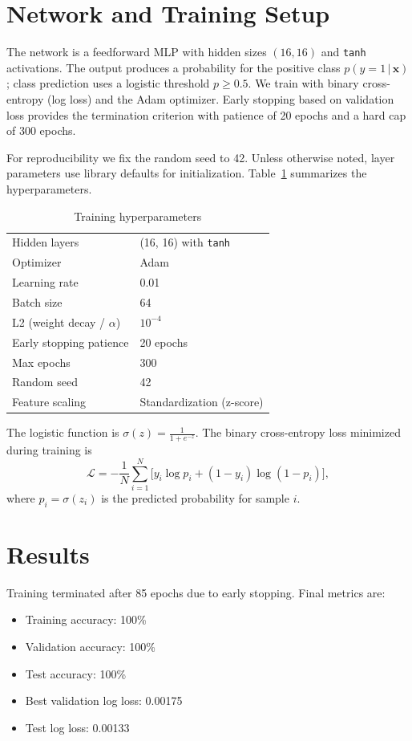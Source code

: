 \documentclass[journal]{IEEEtran}
\begin{document}
\section{Network and Training Setup}
The network is a feedforward MLP with hidden sizes $(16,16)$ and \texttt{tanh} activations. The output produces a probability for the positive class $p(y{=}1\,|\,\mathbf{x})$; class prediction uses a logistic threshold $p\ge 0.5$. We train with binary cross-entropy (log loss) and the Adam optimizer. Early stopping based on validation loss provides the termination criterion with patience of 20 epochs and a hard cap of 300 epochs.

For reproducibility we fix the random seed to 42. Unless otherwise noted, layer parameters use library defaults for initialization. Table~\ref{tab:hyper} summarizes the hyperparameters.

\begin{table}[!t]
\caption{Training hyperparameters}
\label{tab:hyper}
\centering
\begin{tabular}{ll}
\hline
Hidden layers & (16, 16) with \texttt{tanh} \\
Optimizer & Adam \\
Learning rate & 0.01 \\
Batch size & 64 \\
L2 (weight decay / $\alpha$) & $10^{-4}$ \\
Early stopping patience & 20 epochs \\
Max epochs & 300 \\
Random seed & 42 \\
Feature scaling & Standardization (z-score) \\
\hline
\end{tabular}
\end{table}

The logistic function is $\sigma(z){=}\frac{1}{1+e^{-z}}$. The binary cross-entropy loss minimized during training is
\begin{equation}
\mathcal{L} = -\frac{1}{N}\sum_{i=1}^N \big[y_i \log p_i + (1-y_i)\log (1-p_i)\big],
\end{equation}
where $p_i=\sigma(z_i)$ is the predicted probability for sample $i$.

\section{Results}
Training terminated after 85 epochs due to early stopping. Final metrics are:
\begin{itemize}
\item Training accuracy: 100\%
\item Validation accuracy: 100\%
\item Test accuracy: 100\%
\item Best validation log loss: 0.00175
\item Test log loss: 0.00133
\end{itemize}
\end{document}

